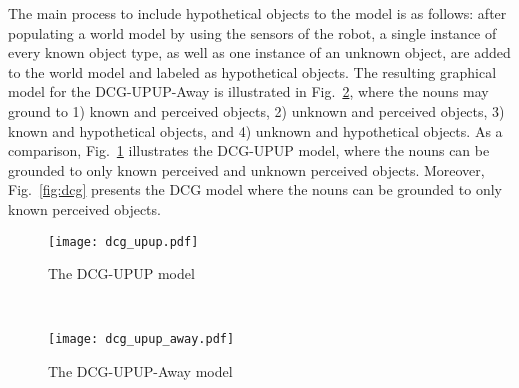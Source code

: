 The main process to include hypothetical objects to the model is as follows: after populating a world model by using the sensors of the robot, a single instance of every known object type, as well as one instance of an unknown object, are added to the world model and labeled as hypothetical objects. The resulting graphical model for the DCG-UPUP-Away is illustrated in Fig.~\ref{fig:dcg-upup-away}, where the nouns may ground to 1) known and perceived objects, 2) unknown and perceived objects, 3) known and hypothetical objects, and 4) unknown and hypothetical objects. As a comparison, Fig.~\ref{fig:dcg-upup} illustrates the DCG-UPUP model, where the nouns can be grounded to only known perceived and unknown perceived objects. Moreover, Fig.~\ref{fig:dcg} presents the DCG model where the nouns can be grounded to only known perceived objects.

\begin{figure*}
\centering
\begin{subfigure}[t]{0.40\textwidth}
\centering
\texttt{[image: dcg\_upup.pdf]}
\caption{The DCG-UPUP model}
\label{fig:dcg-upup}
\end{subfigure}
~~~~
\begin{subfigure}[t]{0.52\textwidth}
\centering
\texttt{[image: dcg\_upup\_away.pdf]}
\caption{The DCG-UPUP-Away model}
\label{fig:dcg-upup-away}
\end{subfigure}
\caption{The graphical models constructed for the command ``\emph{move to the cone}".}
\end{figure*}

